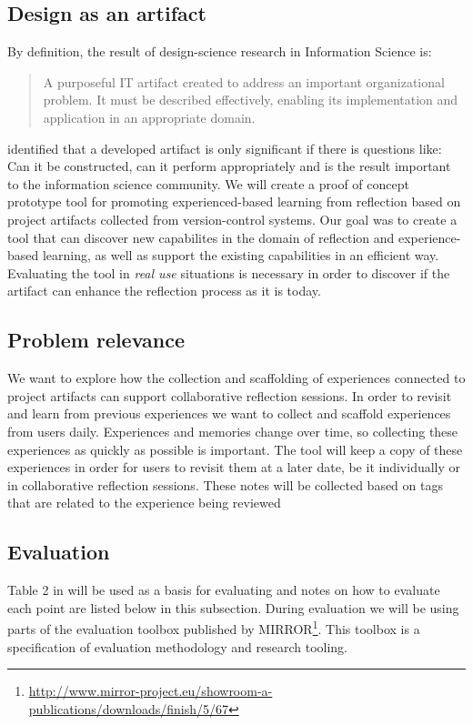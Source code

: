 \subsection{Design as an artifact}
By definition, the result of design-science research in Information Science is:
\begin{quote}
A purposeful IT artifact created to address an important organizational problem. It must be described effectively, enabling its implementation and application in an appropriate domain.
\end{quote}
\cite{Markus et al. 2002} identified that a developed artifact is only significant if there is questions like: Can it be constructed, can it perform appropriately and is the result important to the information science community. 
We will create a proof of concept prototype tool for promoting experienced-based learning from reflection based on project artifacts collected from version-control systems. Our goal was to create a tool that can discover new capabilites in the domain of reflection and experience-based learning, as well as support the existing capabilities in an efficient way. Evaluating the tool in \emph{real use} situations is necessary in order to discover if the artifact can enhance the reflection process as it is today. 

\subsection{Problem relevance}
We want to explore how the collection and scaffolding of experiences connected to project artifacts can support collaborative reflection sessions. In order to revisit and learn from previous experiences we want to collect and scaffold experiences from users daily. Experiences and memories change over time, so collecting these experiences as quickly as possible is important. The tool will keep a copy of these experiences in order for users to revisit them at a later date, be it individually or in collaborative reflection sessions. These notes will be collected based on tags that are related to the experience being reviewed \cite{Hassan-montero2006}

\subsection{Evaluation}
Table 2 in \cite{Esearch2004} will be used as a basis for evaluating and notes on how to evaluate each point are listed below in this subsection.
During evaluation we will be using parts of the evaluation toolbox published by MIRROR\footnote{\url{http://www.mirror-project.eu/showroom-a-publications/downloads/finish/5/67}}. This toolbox is a specification of evaluation methodology and research tooling. 

